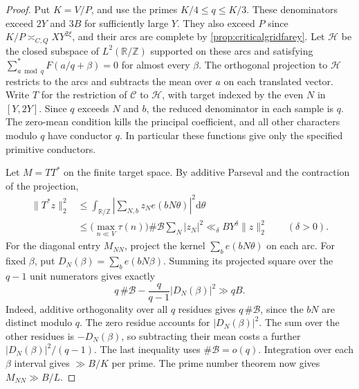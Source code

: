 \documentclass[11pt,a4paper]{article}
\numberwithin{equation}{section}
\newcommand{\ud}{\mathrm d}
\begin{document}
\begin{proof}
Put $K=V/P$, and use the primes $K/4\le q\le K/3$. These
denominators exceed $2Y$ and $3B$ for sufficiently large $Y$.
They also exceed $P$ since $K/P\asymp_{C,Q}XY^{2\xi}$,
and their arcs are complete by \cref{prop:criticalgridfarey}.
Let $\mathcal H$ be the closed subspace of $L^2(\mathbb R/\mathbb Z)$
supported on these arcs and satisfying
$\sum_{a\bmod q}^* F(a/q+\beta)=0$ for almost every $\beta$.
The orthogonal projection to $\mathcal H$ restricts to the arcs
and subtracts the mean over $a$ on each translated vector.
Write $T$ for the restriction of $\mathcal C$ to $\mathcal H$,
with target indexed by the even $N$ in $[Y,2Y]$.
Since $q$ exceeds $N$ and $b$, the reduced denominator in each
sample is $q$. The zero-mean condition kills the principal
coefficient, and all other characters modulo $q$ have conductor
$q$. In particular these functions give only the specified
primitive conductors.

Let $M=TT^*$ on the finite target space. By additive Parseval
and the contraction of the projection,
\begin{align*}
 \|T^*z\|_2^2
 &\le\int_{\mathbb R/\mathbb Z}
          \left|\sum_{N,b} z_N e(bN\theta)\right|^2\ud\theta\\
 &\le \bigl(\max_{n\ll V}\tau(n)\bigr)\#\mathcal B
                     \sum_N |z_N|^2 \ll_\delta B Y^\delta\|z\|_2^2
                     \qquad(\delta>0).
\end{align*}
For the diagonal entry $M_{NN}$, project the kernel
$\sum_b e(bN\theta)$ on each arc.
For fixed $\beta$, put $D_N(\beta)=\sum_b e(bN\beta)$.
Summing its projected square over the $q-1$ unit numerators
gives exactly
\begin{equation}
 q\,\#\mathcal B-\frac{q}{q-1}|D_N(\beta)|^2
                   \gg q B.
 \label{eq:criticalgridarcrownorm}
\end{equation}
Indeed, additive orthogonality over all $q$ residues gives
$q\,\#\mathcal B$, since the $bN$ are distinct modulo $q$.
The zero residue accounts for $|D_N(\beta)|^2$.
The sum over the other residues is $-D_N(\beta)$, so subtracting
their mean costs a further $|D_N(\beta)|^2/(q-1)$.
The last inequality uses $\#\mathcal B=o(q)$.
Integration over each $\beta$ interval gives $\gg B/K$ per
prime. The prime number theorem now gives $M_{NN}\gg B/L$.


\end{proof}
\end{document}
